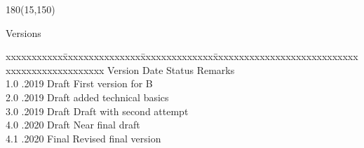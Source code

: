 \begin{textblock}{180}(15,150)
\color{black}
\begin{huge}
Versions
\end{huge}
\vspace{10mm}

\fontsize{10pt}{18pt}\selectfont
\begin{tabbing}
xxxxxxxxxxx\=xxxxxxxxxxxxxxx\=xxxxxxxxxxxxxx\=xxxxxxxxxxxxxxxxxxxxxxxxxxxxxxxxxxxxxxxxxxxxxxx \kill
Version	\> Date	\> Status			\> Remarks		\\
1.0	.2019	\> Draft		\> First version for B	\\	
2.0	.2019	\> Draft		\> added technical basics	\\	
3.0	.2019	\> Draft		\> Draft with second attempt	\\	
4.0	.2020	\> Draft    	\> Near final draft	\\	
4.1	.2020	\> Final		\> Revised final version	\\	
\end{tabbing}

\end{textblock}
\null\newpage
